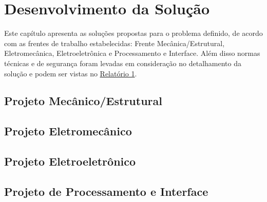 \chapter{Desenvolvimento da Solução}
\label{desenvolvimento}

Este capítulo apresenta as soluções propostas para o problema definido, de acordo com as frentes de trabalho estabelecidas: 
Frente Mecânica/Estrutural, Eletromecânica, Eletroeletrônica e Processamento e Interface. Além disso normas técnicas e de segurança
foram levadas em consideração no detalhamento da solução e podem ser vistas no 
\href{https://drive.google.com/file/d/0B5InkGKx6O-MR1B3eVYzZFpjQ3c/view?usp=sharing}{Relatório 1}. 


\section{Projeto Mecânico/Estrutural}



\section{Projeto Eletromecânico}



\section{Projeto Eletroeletrônico}



\section{Projeto de Processamento e Interface}




